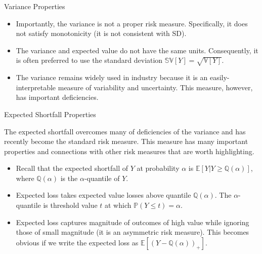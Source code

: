 \documentclass[handout,9pt]{beamer}
\begin{document}
%
\begin{frame}{Variance Properties}

\begin{itemize}
\setlength{\itemsep}{10pt}
\item Importantly, the variance is not a proper risk measure. Specifically, it does not satisfy monotonicity (it is not consistent with SD). 

\item The variance and expected value do not have the same units. Consequently, it is often preferred to use the standard deviation $\mathbb{SV}[Y]=\sqrt{\mathbb{V}[Y]}$. 

\item The variance remains widely used in industry because it is an easily-interpretable measure of variability and uncertainty. This measure, however, has important deficiencies. 

\end{itemize}


\end{frame}

%
\begin{frame}{Expected Shortfall Properties}


The expected shortfall overcomes many of deficiencies of the variance and has recently become the standard risk measure.  This measure has many important properties and connections with other risk measures that are worth highlighting.  

\begin{itemize}
\setlength{\itemsep}{10pt}
\item Recall that the expected shortfall of $Y$ at probability $\alpha$ is $\mathbb{E}[Y|Y\geq \mathbb{Q}(\alpha)]$, where $\mathbb{Q}(\alpha)$ is the $\alpha$-quantile of $Y$. 

\item Expected loss takes expected value losses above quantile $\mathbb{Q}(\alpha)$. The  $\alpha$-quantile is threshold value $t$ at which $\mathbb{P}(Y\leq t)=\alpha$. 

\item Expected loss captures magnitude of outcomes of high value while ignoring those of small magnitude (it is an asymmetric risk measure). This becomes obvious if we write the expected loss as $\mathbb{E}[(Y-\mathbb{Q}(\alpha))_+]$. 

\end{itemize}



\end{frame}
\end{document}
